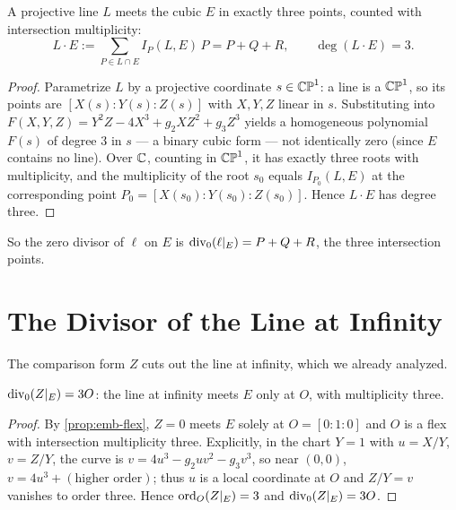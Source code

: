 \begin{proposition}
\label{prop:lin-bezout}
A projective line \(L\) meets the cubic \(E\) in exactly three points, counted with
intersection multiplicity:
\[
  L \cdot E := \sum_{P \in L \cap E} I_P(L,E)\, P
  = P + Q + R, \qquad \deg(L \cdot E) = 3 .
\]
\end{proposition}

\begin{proof}
Parametrize \(L\) by a projective coordinate \(s \in \mathbb{CP}^1\): a line is a
\(\mathbb{CP}^1\), so its points are \([X(s) : Y(s) : Z(s)]\) with \(X, Y, Z\) linear in
\(s\). Substituting into \(F(X,Y,Z) = Y^2 Z - 4X^3 + g_2 X Z^2 + g_3 Z^3\) yields a
homogeneous polynomial \(F(s)\) of degree \(3\) in \(s\) --- a binary cubic form ---
not identically zero (since \(E\) contains no line). Over \(\mathbb{C}\), counting in
\(\mathbb{CP}^1\), it has exactly three roots with multiplicity, and the multiplicity of
the root \(s_0\) equals \(I_{P_0}(L,E)\) at the corresponding point
\(P_0 = [X(s_0):Y(s_0):Z(s_0)]\). Hence \(L \cdot E\) has degree three.
\end{proof}

So the zero divisor of \(\ell\) on \(E\) is \(\operatorname{div}_0(\ell|_E) = P + Q + R\),
the three intersection points.

\section{The Divisor of the Line at Infinity}
\label{sec:lin-infinity}

The comparison form \(Z\) cuts out the line at infinity, which we already analyzed.

\begin{proposition}
\label{prop:lin-infinity}
\(\operatorname{div}_0(Z|_E) = 3O\): the line at infinity meets \(E\) only at \(O\), with
multiplicity three.
\end{proposition}

\begin{proof}
By \cref{prop:emb-flex}, \(Z = 0\) meets \(E\) solely at \(O = [0:1:0]\) and \(O\)
is a flex with intersection multiplicity three. Explicitly, in the chart \(Y = 1\)
with \(u = X/Y\), \(v = Z/Y\), the curve is \(v = 4u^3 - g_2 u v^2 - g_3 v^3\), so
near \((0,0)\), \(v = 4u^3 + (\text{higher order})\); thus \(u\) is a local
coordinate at \(O\) and \(Z/Y = v\) vanishes to order three. Hence
\(\operatorname{ord}_O(Z|_E) = 3\) and \(\operatorname{div}_0(Z|_E) = 3O\).
\end{proof}

